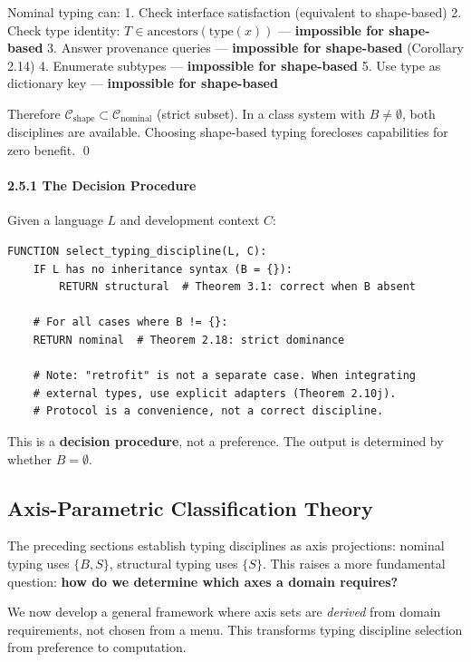 Nominal typing can: 1. Check interface satisfaction (equivalent to
shape-based) 2. Check type identity:
\(T \in \text{ancestors}(\text{type}(x))\) --- \textbf{impossible for
shape-based} 3. Answer provenance queries --- \textbf{impossible for
shape-based} (Corollary 2.14) 4. Enumerate subtypes ---
\textbf{impossible for shape-based} 5. Use type as dictionary key ---
\textbf{impossible for shape-based}

Therefore
\(\mathcal{C}_{\text{shape}} \subset \mathcal{C}_{\text{nominal}}\)
(strict subset). In a class system with \(B \neq \emptyset\), both
disciplines are available. Choosing shape-based typing forecloses
capabilities for zero benefit. \qed

\paragraph{2.5.1 The Decision Procedure}\label{the-decision-procedure}

Given a language \(L\) and development context \(C\):

\begin{verbatim}
FUNCTION select_typing_discipline(L, C):
    IF L has no inheritance syntax (B = {}):
        RETURN structural  # Theorem 3.1: correct when B absent

    # For all cases where B != {}:
    RETURN nominal  # Theorem 2.18: strict dominance

    # Note: "retrofit" is not a separate case. When integrating
    # external types, use explicit adapters (Theorem 2.10j).
    # Protocol is a convenience, not a correct discipline.
\end{verbatim}

This is a \textbf{decision procedure}, not a preference. The output is
determined by whether \(B = \emptyset\).

\subsection{Axis-Parametric Classification Theory}\label{axis-parametric-classification}

The preceding sections establish typing disciplines as axis projections: nominal typing uses \(\{B, S\}\), structural typing uses \(\{S\}\). This raises a more fundamental question: \textbf{how do we determine which axes a domain requires?}

We now develop a general framework where axis sets are \emph{derived} from domain requirements, not chosen from a menu. This transforms typing discipline selection from preference to computation.

